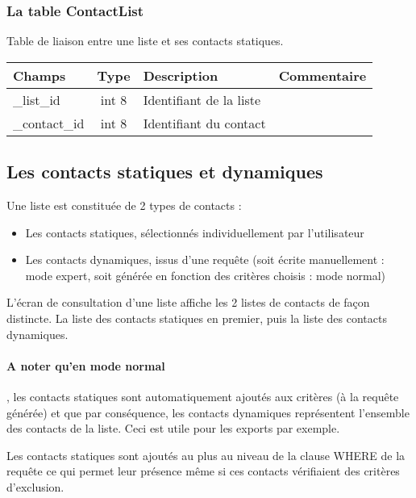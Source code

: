 \subsubsection{La table ContactList}
Table de liaison entre une liste et ses contacts statiques.\\

\begin{tabular}{|p{3cm}|c|p{5.4cm}|p{2.6cm}|}
\hline
\textbf{Champs} & \textbf{Type} & \textbf{Description} & \textbf{Commentaire} \\
\hline
\_list\_id & int 8 & Identifiant de la liste & \\
\hline
\_contact\_id & int 8 & Identifiant du contact & \\
\hline
\end{tabular}


\subsection{Les contacts statiques et dynamiques}

Une liste est constituée de 2 types de contacts :

\begin{itemize}
\item Les contacts statiques, sélectionnés individuellement par l'utilisateur
\item Les contacts dynamiques, issus d'une requête (soit écrite manuellement : mode expert, soit générée en fonction des critères choisis : mode normal)
\end{itemize}
\vspace{0.3cm}

L'écran de consultation d'une liste affiche les 2 listes de contacts de façon distincte. La liste des contacts statiques en premier, puis la liste des contacts dynamiques.

\paragraph{A noter qu'en mode normal}, les contacts statiques sont automatiquement ajoutés aux critères (à la requête générée) et que par conséquence, les contacts dynamiques représentent l'ensemble des contacts de la liste. Ceci est utile pour les exports par exemple.

Les contacts statiques sont ajoutés au plus au niveau de la clause WHERE de la requête ce qui permet leur présence même si ces contacts vérifiaient des critères d'exclusion.


